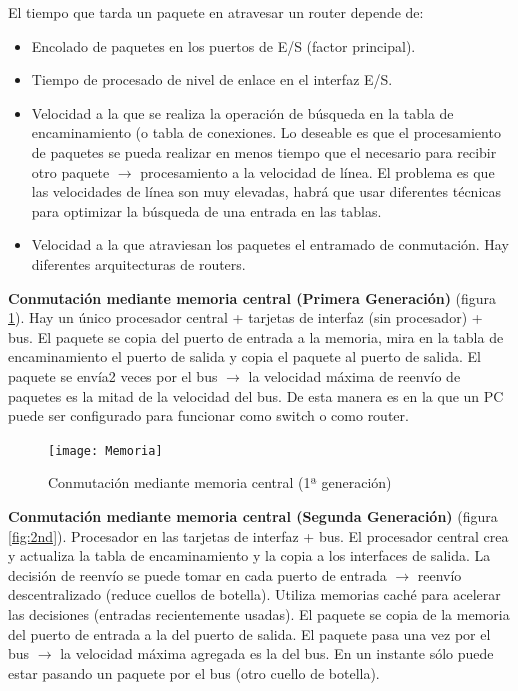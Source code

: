 \documentclass[10pt,portrait, twocolumn]{article}
\begin{document}
\quad El tiempo que tarda un paquete en atravesar un router depende de:
	\begin{itemize}
		\item Encolado de paquetes en los puertos de E/S (factor principal).
		\item Tiempo de procesado de nivel de enlace en el interfaz E/S.
		\item Velocidad a la que se realiza la operación de búsqueda en la tabla de encaminamiento (o tabla de conexiones. Lo deseable es que el procesamiento de paquetes se pueda realizar en menos tiempo que el necesario para recibir otro paquete $\rightarrow$ procesamiento a la velocidad de línea. El problema es que las velocidades de línea son muy elevadas, habrá que usar diferentes técnicas para optimizar la búsqueda de una entrada en las tablas.
		\item Velocidad a la que atraviesan los paquetes el entramado de conmutación. Hay diferentes arquitecturas de routers.
	\end{itemize}
	
\textbf{Conmutación mediante memoria central (Primera Generación)} (figura \ref{fig:1st}). Hay un único procesador central + tarjetas de interfaz (sin procesador) + bus. El paquete se copia del puerto de entrada a la memoria, mira en la tabla de encaminamiento el puerto de salida y copia el paquete al puerto de salida. El paquete se envía2 veces por el bus $\rightarrow$ la velocidad máxima de reenvío de paquetes es la mitad de la velocidad del bus. De esta manera es en la que un PC puede ser configurado para funcionar como switch o como router.

\begin{figure}[h]
	\centering
     \texttt{[image: Memoria]}
      \caption{Conmutación mediante memoria central (1ª generación)}
      \label{fig:1st}
\end{figure}

\textbf{Conmutación mediante memoria central (Segunda Generación)} (figura \ref{fig:2nd}). Procesador en las tarjetas de interfaz + bus. El procesador central crea y actualiza la tabla de encaminamiento y la copia a los interfaces de salida. La decisión de reenvío se puede tomar en cada puerto de entrada $\rightarrow$ reenvío descentralizado (reduce cuellos de botella). Utiliza memorias caché para acelerar las decisiones (entradas recientemente usadas). El paquete se copia de la memoria del puerto de entrada a la del puerto de salida. El paquete pasa una vez por el bus $\rightarrow$ la velocidad máxima agregada es la del bus. En un instante sólo puede estar pasando un paquete por el bus (otro cuello de botella).
\end{document}
